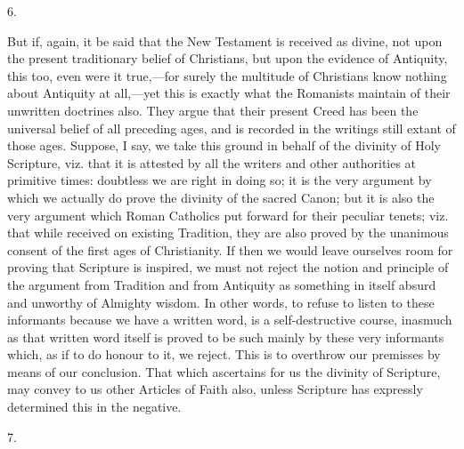 6.

But if, again, it be said that the New Testament is received as
divine, not upon the present traditionary belief of Christians, but
upon the evidence of Antiquity, this too, even were it true,—for
surely the multitude of Christians know nothing about Antiquity at
all,—yet this is exactly what the Romanists maintain of their
unwritten doctrines also. They argue that their present Creed has been
the universal belief of all preceding ages, and is recorded in the
writings still extant of those ages. Suppose, I say, we take this
ground in behalf of the divinity of Holy Scripture, viz. that it is
attested by all the writers and other authorities at primitive times:
doubtless we are right in doing so; it is the very argument by which
we actually do prove the divinity of the sacred Canon; but it is also
the very argument which Roman Catholics put forward for their
peculiar tenets; viz. that while received on existing Tradition, they
are also proved by the unanimous consent of the first ages of
Christianity. If then we would leave ourselves room for proving that
Scripture is inspired, we must not reject the notion and principle of
the argument from Tradition and from Antiquity as something in itself
absurd and unworthy of Almighty wisdom. In other words, to refuse to
listen to these informants because we have a written word, is a
self-destructive course, inasmuch as that written word itself is
proved to be such mainly by these very informants which, as if to do
honour to it, we reject. This is to overthrow our premisses by means
of our conclusion. That which ascertains for us the divinity of
Scripture, may convey to us other Articles of Faith also, unless
Scripture has expressly determined this in the negative.

7.

